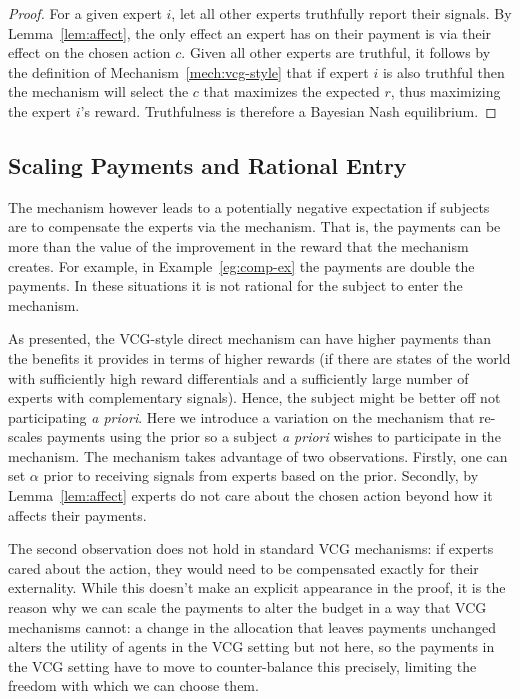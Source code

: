 \begin{proof}
For a given expert $i$, let all other experts truthfully report their signals. By Lemma~\ref{lem:affect}, the only effect an expert has on their payment is via their effect on the chosen action $c$. Given all other experts are truthful, it follows by the definition of Mechanism~\ref{mech:vcg-style} that if expert $i$ is also truthful then the mechanism will select the $c$ that maximizes the expected $r$, thus maximizing the expert $i$'s reward. Truthfulness is therefore a Bayesian Nash equilibrium.
\end{proof}


\subsection{Scaling Payments and Rational Entry}

The mechanism however leads to a potentially negative expectation if subjects are to compensate the experts via the mechanism.  
That is, the payments can be more than the value of the improvement in the reward that the mechanism creates. For example, in Example~\ref{eg:comp-ex} the payments are double the payments. In these situations it is not rational for the subject to enter the mechanism.


As presented, the VCG-style direct mechanism can have higher payments than the benefits it provides in terms of higher rewards (if there are states of the world with sufficiently high reward differentials and a sufficiently large number of experts with complementary signals). Hence, the subject might be better off not participating \emph{a priori}. Here we introduce a variation on the mechanism that re-scales payments using the prior so a subject \emph{a priori} wishes to participate in the mechanism. The mechanism takes advantage of two observations. Firstly, one can set $\alpha$ prior to receiving signals from experts based on the prior. Secondly, by Lemma~\ref{lem:affect} experts do not care about the chosen action beyond how it affects their payments. 

The second observation does not hold in standard VCG mechanisms: if experts cared about the action, they would need to be compensated exactly for their externality. While this doesn't make an explicit appearance in the proof, it is the reason why we can scale the payments to alter the budget in a way that VCG mechanisms cannot: a change in the allocation that leaves payments unchanged alters the utility of agents in the VCG setting but not here, so the payments in the VCG setting have to move to counter-balance this precisely, limiting the freedom with which we can choose them.

